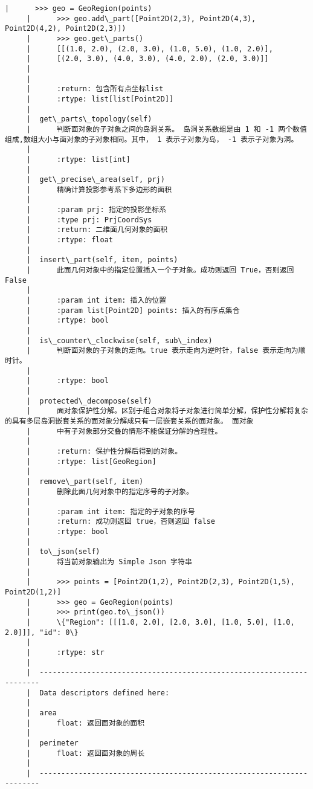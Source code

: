 \documentclass[11pt]{article}
\begin{document}
\begin{Verbatim}[commandchars=\\\{\}]
     |      >>> geo = GeoRegion(points)
     |      >>> geo.add\_part([Point2D(2,3), Point2D(4,3), Point2D(4,2), Point2D(2,3)])
     |      >>> geo.get\_parts()
     |      [[(1.0, 2.0), (2.0, 3.0), (1.0, 5.0), (1.0, 2.0)],
     |      [(2.0, 3.0), (4.0, 3.0), (4.0, 2.0), (2.0, 3.0)]]
     |      
     |      
     |      :return: 包含所有点坐标list
     |      :rtype: list[list[Point2D]]
     |  
     |  get\_parts\_topology(self)
     |      判断面对象的子对象之间的岛洞关系。 岛洞关系数组是由 1 和 -1 两个数值组成,数组大小与面对象的子对象相同。其中， 1 表示子对象为岛， -1 表示子对象为洞。
     |      
     |      :rtype: list[int]
     |  
     |  get\_precise\_area(self, prj)
     |      精确计算投影参考系下多边形的面积
     |      
     |      :param prj: 指定的投影坐标系
     |      :type prj: PrjCoordSys
     |      :return: 二维面几何对象的面积
     |      :rtype: float
     |  
     |  insert\_part(self, item, points)
     |      此面几何对象中的指定位置插入一个子对象。成功则返回 True，否则返回 False
     |      
     |      :param int item: 插入的位置
     |      :param list[Point2D] points: 插入的有序点集合
     |      :rtype: bool
     |  
     |  is\_counter\_clockwise(self, sub\_index)
     |      判断面对象的子对象的走向。true 表示走向为逆时针，false 表示走向为顺时针。
     |      
     |      :rtype: bool
     |  
     |  protected\_decompose(self)
     |      面对象保护性分解。区别于组合对象将子对象进行简单分解，保护性分解将复杂的具有多层岛洞嵌套关系的面对象分解成只有一层嵌套关系的面对象。 面对象
     |      中有子对象部分交叠的情形不能保证分解的合理性。
     |      
     |      :return: 保护性分解后得到的对象。
     |      :rtype: list[GeoRegion]
     |  
     |  remove\_part(self, item)
     |      删除此面几何对象中的指定序号的子对象。
     |      
     |      :param int item: 指定的子对象的序号
     |      :return: 成功则返回 true，否则返回 false
     |      :rtype: bool
     |  
     |  to\_json(self)
     |      将当前对象输出为 Simple Json 字符串
     |      
     |      >>> points = [Point2D(1,2), Point2D(2,3), Point2D(1,5), Point2D(1,2)]
     |      >>> geo = GeoRegion(points)
     |      >>> print(geo.to\_json())
     |      \{"Region": [[[1.0, 2.0], [2.0, 3.0], [1.0, 5.0], [1.0, 2.0]]], "id": 0\}
     |      
     |      :rtype: str
     |  
     |  ----------------------------------------------------------------------
     |  Data descriptors defined here:
     |  
     |  area
     |      float: 返回面对象的面积
     |  
     |  perimeter
     |      float: 返回面对象的周长
     |  
     |  ----------------------------------------------------------------------

\end{Verbatim}
\end{document}
